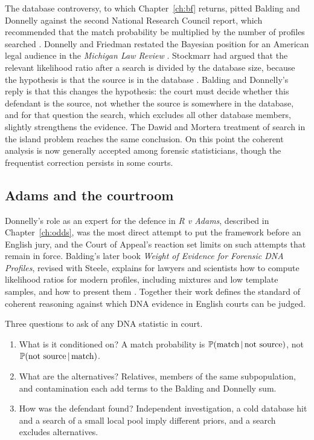 The database controversy, to which Chapter~\ref{ch:bf} returns, pitted Balding and Donnelly against the second National Research Council report, which recommended that the match probability be multiplied by the number of profiles searched \citep{nrc1996}. Donnelly and Friedman restated the Bayesian position for an American legal audience in the \emph{Michigan Law Review} \citep{donnelly1999}. Stockmarr had argued that the relevant likelihood ratio after a search is divided by the database size, because the hypothesis is that the source is in the database \citep{stockmarr1999}. Balding and Donnelly's reply is that this changes the hypothesis: the court must decide whether this defendant is the source, not whether the source is somewhere in the database, and for that question the search, which excludes all other database members, slightly strengthens the evidence. The Dawid and Mortera treatment of search in the island problem reaches the same conclusion. On this point the coherent analysis is now generally accepted among forensic statisticians, though the frequentist correction persists in some courts.

\subsection{Adams and the courtroom}

Donnelly's role as an expert for the defence in \emph{R v Adams}, described in Chapter~\ref{ch:odds}, was the most direct attempt to put the framework before an English jury, and the Court of Appeal's reaction set limits on such attempts that remain in force. Balding's later book \emph{Weight of Evidence for Forensic DNA Profiles}, revised with Steele, explains for lawyers and scientists how to compute likelihood ratios for modern profiles, including mixtures and low template samples, and how to present them \citep{balding2005,balding2015}. Together their work defines the standard of coherent reasoning against which DNA evidence in English courts can be judged.

\begin{keybox}
Three questions to ask of any DNA statistic in court.
\begin{enumerate}[label=\arabic*.]
\item What is it conditioned on? A match probability is $\mathbb{P}(\text{match}\,\vert\, \text{not source})$, not $\mathbb{P}(\text{not source}\,\vert\,\text{match})$.
\item What are the alternatives? Relatives, members of the same subpopulation, and contamination each add terms to the Balding and Donnelly sum.
\item How was the defendant found? Independent investigation, a cold database hit and a search of a small local pool imply different priors, and a search excludes alternatives.
\end{enumerate}
\end{keybox}

